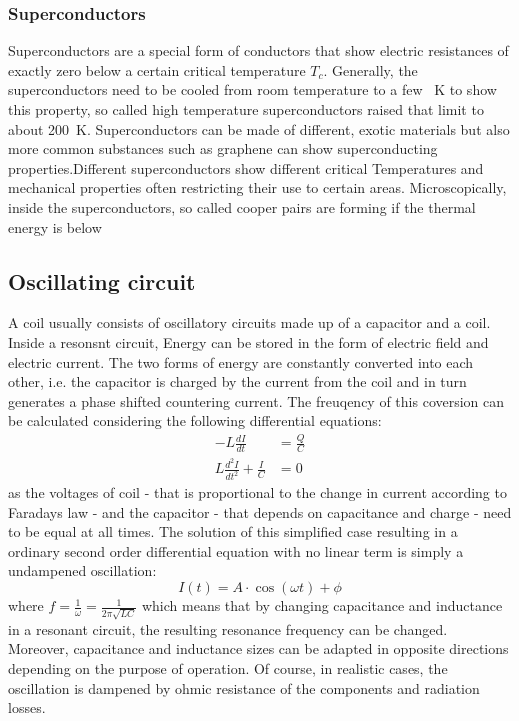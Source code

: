                 \subsubsection{Superconductors}
                Superconductors are a special form of conductors that show electric resistances of exactly zero below a certain critical temperature $T_c$. Generally, the superconductors need to be cooled from room temperature to a few \SI{}{\kelvin} to show this property, so called high temperature superconductors raised that limit to about \SI{200}{\kelvin}. Superconductors can be made of different, exotic materials but also more common substances such as graphene can show superconducting properties.Different superconductors show different critical Temperatures and mechanical properties often restricting their use to certain areas. Microscopically, inside the superconductors, so called cooper pairs are forming if the thermal energy is below 
            \subsection{Oscillating circuit}
            A coil usually consists of oscillatory circuits made up of a capacitor and a coil. Inside a resonsnt circuit, Energy can be stored in the form of electric field and electric current. The two forms of energy are constantly converted into each other, i.e. the capacitor is charged by the current from the coil and in turn generates a phase shifted countering current. The freuqency of this coversion can be calculated considering the following differential equations:
            \begin{equation}
                \begin{aligned}
                    -L\frac{dI}{dt} &= \frac{Q}{C} \\
                    L\frac{d^2I}{dt^2} + \frac{I}{C} &= 0
                \end{aligned}
            \end{equation}
            as the voltages of coil - that is proportional to the change in current according to Faradays law - and the capacitor - that depends on capacitance and charge - need to be equal at all times. The solution of this simplified case resulting in a ordinary second order differential equation with no linear term is simply a undampened oscillation:
            \begin{equation}
                I(t) =  A \cdot \cos(\omega t) + \phi 
            \end{equation}
            where $f= \frac{1}{\omega} = \frac{1}{2\pi\sqrt{LC}}$ which means that by changing capacitance and inductance in a resonant circuit, the resulting resonance frequency can be changed. Moreover, capacitance and inductance sizes can be adapted in opposite directions depending on the purpose of operation.
            Of course, in realistic cases, the oscillation is dampened by ohmic resistance of the components and radiation losses. 
